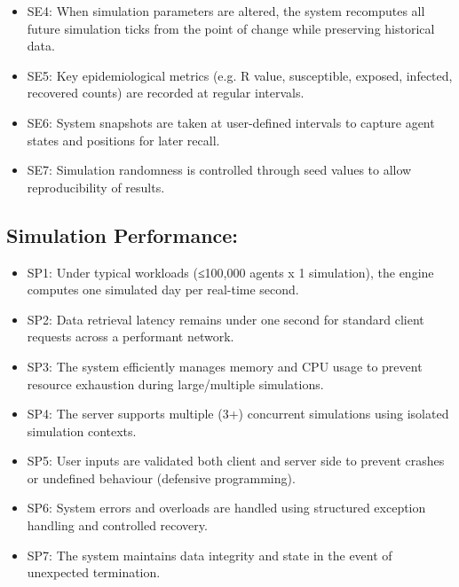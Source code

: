 \begin{itemize}
\begin{itemize}
        \item \label{req:SE3.4} SE3.4: Applied mitigations influence infection system.
        \item \label{req:SE3.5} SE3.5: Disease transmission is calculated based on proximity between agents within each tick.
    \end{itemize}
    \item\label{req:SE4} SE4: When simulation parameters are altered, the system recomputes all future simulation ticks from the point of change while preserving historical data.
    \item\label{req:SE5} SE5: Key epidemiological metrics (e.g. R value, susceptible, exposed, infected, recovered counts) are recorded at regular intervals.
    \item\label{req:SE6} SE6: System snapshots are taken at user-defined intervals to capture agent states and positions for later recall.
    \item\label{req:SE7} SE7: Simulation randomness is controlled through seed values to allow reproducibility of results.
\end{itemize}

\subsection{Simulation Performance:}
\begin{itemize}
    \item\label{req:SP1} SP1: Under typical workloads (≤100,000 agents x 1 simulation), the engine computes one simulated day per real-time second.
    \item\label{req:SP2} SP2: Data retrieval latency remains under one second for standard client requests across a performant network.
    \item\label{req:SP3} SP3: The system efficiently manages memory and CPU usage to prevent resource exhaustion during large/multiple simulations.
    \item\label{req:SP4} SP4: The server supports multiple (3+) concurrent simulations using isolated simulation contexts.
    \item\label{req:SP5} SP5: User inputs are validated both client and server side to prevent crashes or undefined behaviour (defensive programming).
    \item\label{req:SP6} SP6: System errors and overloads are handled using structured exception handling and controlled recovery.
    \item\label{req:SP7} SP7: The system maintains data integrity and state in the event of unexpected termination.
\end{itemize}

